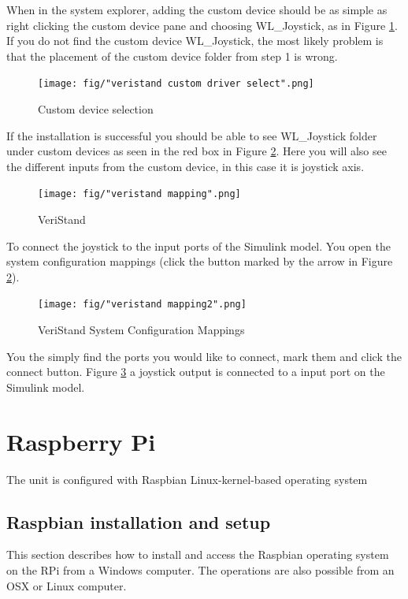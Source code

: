 \documentclass[a4paper,english]{report}
\begin{document}
When in the system explorer, adding the custom device should be as simple as right clicking the custom device pane and choosing WL\_Joystick, as in Figure \ref{fig: custom device selection}. If you do not find the custom device WL\_Joystick, the most likely problem is that the placement of the custom device folder from step 1 is wrong.
\begin{figure}[htb!]
	\centering \texttt{[image: fig/"veristand custom driver select".png]}
	\caption{Custom device selection}
	\label{fig: custom device selection} 
\end{figure}
If the installation is successful you should be able to see WL\_Joystick folder under custom devices as seen in the red box in Figure \ref{fig: veristand confirmation}. Here you will also see the different inputs from the custom device, in this case it is joystick axis.
\begin{figure}[htb!]
	\centering \texttt{[image: fig/"veristand mapping".png]}
	\caption{VeriStand}
	\label{fig: veristand confirmation} 
\end{figure}
To connect the joystick to the input ports of the Simulink model. You open the system configuration mappings (click the button marked by the arrow in Figure \ref{fig: veristand confirmation}).
\begin{figure}[htb!]
	\centering \texttt{[image: fig/"veristand mapping2".png]}
	\caption{VeriStand System Configuration Mappings}
	\label{fig: veristand mappings} 
\end{figure}
You the simply find the ports you would like to connect, mark them and click the connect button. Figure \ref{fig: veristand mappings} a joystick output is connected to a input port on the Simulink model.
\section{Raspberry Pi}\label{subsec: RPi setup}
The unit is configured with Raspbian Linux-kernel-based operating system 
\subsection{Raspbian installation and setup}
This section describes how to install and access the Raspbian operating system on the RPi from a Windows computer. The operations are also possible from an OSX or Linux computer.
\end{document}
